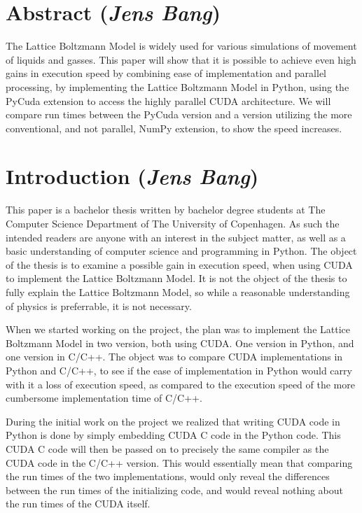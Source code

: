
\section*{Abstract (\textit{Jens Bang})}

The Lattice Boltzmann Model is widely used for various simulations of movement of liquids and gasses. This paper will show that it is possible to achieve even high gains in execution speed by combining ease of implementation and parallel processing, by implementing the Lattice Boltzmann Model in Python, using the PyCuda extension to access the highly parallel CUDA architecture. We will compare run times between the PyCuda version and a version utilizing the more conventional, and not parallel, NumPy extension, to show the speed increases.

\newpage
\tableofcontents
\newpage

\section{Introduction (\textit{Jens Bang})}

This paper is a bachelor thesis written by bachelor degree students at The Computer Science Department of The University of Copenhagen. As such the intended readers are anyone with an interest in the subject matter, as well as a basic understanding of computer science and programming in Python. The object of the thesis is to examine a possible gain in execution speed, when using CUDA to implement the Lattice Boltzmann Model. It is not the object of the thesis to fully explain the Lattice Boltzmann Model, so while a reasonable understanding of physics is preferrable, it is not necessary.

When we started working on the project, the plan was to implement the Lattice Boltzmann Model in two version, both using CUDA. One version in Python, and one version in C/C++. The object was to compare CUDA implementations in Python and C/C++, to see if the ease of implementation in Python would carry with it a loss of execution speed, as compared to the execution speed of the more cumbersome implementation time of C/C++.

During the initial work on the project we realized that writing CUDA code in Python is done by simply embedding CUDA C code in the Python code. This CUDA C code will then be passed on to precisely the same compiler as the CUDA code in the C/C++ version. This would essentially mean that comparing the run times of the two implementations, would only reveal the differences between the run times of the initializing code, and would reveal nothing about the run times of the CUDA itself.

